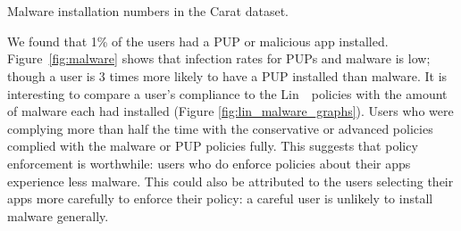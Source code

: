 \documentclass[thesis.tex]{subfiles}
\begin{document}
\begin{marginfigure}
  \centering
  \\
  \\
  \caption{Malware installation numbers in the Carat dataset.}
  \label{fig:malware}
\end{marginfigure}

We found that 1\% of the users had a \ac{PUP} or malicious app
installed.  Figure~\ref{fig:malware} shows that infection rates for
\acp{PUP} and malware is low; though a user is 3 times more likely to
have a \ac{PUP} installed than malware.  It is interesting to compare
a user's compliance to the Lin~\etal~policies with the amount of
malware each had installed (Figure \autoref{fig:lin_malware_graphs}).
Users who were complying more than half the time with the conservative
or advanced policies complied with the malware or \ac{PUP} policies
fully.  This suggests that policy enforcement is worthwhile: users who
do enforce policies about their apps experience less malware.  This
could also be attributed to the users selecting their apps more
carefully to enforce their policy: a careful user is unlikely to
install malware generally.
\end{document}
